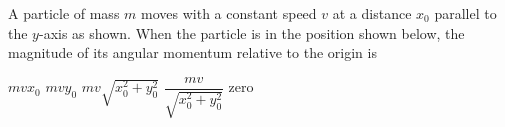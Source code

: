 \documentclass{../../oss-apphys-exam}
\begin{document}



\raggedcolumns
\begin{multicols*}{2}
  \begin{questions}
    \question A particle of mass $m$ moves with a constant speed $v$ at a
    distance $x_0$ parallel to the $y$-axis as shown. When the particle is in
    the position shown below, the magnitude of its angular momentum relative to
    the origin is
    \begin{center}
    \end{center}
    \begin{choices}
      \choice $mvx_0$
      \choice $mvy_0$
      \choice $mv\sqrt{x_0^2+y_0^2}$
      \choice $\dfrac{mv}{\sqrt{x_0^2+y_0^2}}$
      \choice zero
    \end{choices}
    

\end{questions}
\end{multicols*}
\end{document}
